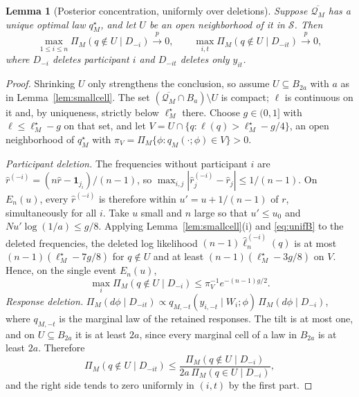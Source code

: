 \documentclass[11pt,letterpaper]{article}
\theoremstyle{plain}
\newtheorem{lemma}[theorem]{Lemma}
\theoremstyle{definition}
\begin{document}
\begin{lemma}[Posterior concentration, uniformly over deletions]\label{lem:deletion}
Suppose $\overline{\mathcal Q_M}$ has a unique optimal law $q^\star_M$, and let $U$ be an open neighborhood of it in $\mathcal S$. Then
\[
\max_{1\le i\le n}\Pi_M(q\notin U\mid D_{-i})\xrightarrow{p}0,\qquad
\max_{i,t}\Pi_M(q\notin U\mid D_{-it})\xrightarrow{p}0,
\]
where $D_{-i}$ deletes participant $i$ and $D_{-it}$ deletes only $y_{it}$.
\end{lemma}
\begin{proof}
Shrinking $U$ only strengthens the conclusion, so assume $U\subseteq B_{2a}$ with $a$ as in Lemma~\ref{lem:smallcell}. The set $(\overline{\mathcal Q_M}\cap B_a)\setminus U$ is compact; $\ell$ is continuous on it and, by uniqueness, strictly below $\ell_M^\star$ there. Choose $g\in(0,1]$ with $\ell\le\ell_M^\star-g$ on that set, and let $V=U\cap\{q:\ell(q)>\ell_M^\star-g/4\}$, an open neighborhood of $q^\star_M$ with $\pi_V=\Pi_M\{\phi:q_M(\cdot;\phi)\in V\}>0$.

\emph{Participant deletion.} The frequencies without participant $i$ are $\hat r^{(-i)}=(n\hat r-\mathbf 1_{j_i})/(n-1)$, so $\max_{i,j}|\hat r^{(-i)}_j-\hat r_j|\le1/(n-1)$. On $E_n(u)$, every $\hat r^{(-i)}$ is therefore within $u'=u+1/(n-1)$ of $r$, simultaneously for all $i$. Take $u$ small and $n$ large so that $u'\le u_0$ and $Nu'\log(1/a)\le g/8$. Applying Lemma~\ref{lem:smallcell}(i) and \eqref{eq:unifB} to the deleted frequencies, the deleted log likelihood $(n-1)\hat\ell^{(-i)}_n(q)$ is at most $(n-1)(\ell_M^\star-7g/8)$ for $q\notin U$ and at least $(n-1)(\ell_M^\star-3g/8)$ on $V$. Hence, on the single event $E_n(u)$,
\[
\max_i\Pi_M(q\notin U\mid D_{-i})\le\pi_V^{-1}e^{-(n-1)g/2}.
\]
\emph{Response deletion.} $\Pi_M(d\phi\mid D_{-it})\propto q_{M,-t}(y_{i,-t}\mid W_i;\phi)\,\Pi_M(d\phi\mid D_{-i})$, where $q_{M,-t}$ is the marginal law of the retained responses. The tilt is at most one, and on $U\subseteq B_{2a}$ it is at least $2a$, since every marginal cell of a law in $B_{2a}$ is at least $2a$. Therefore
\[
\Pi_M(q\notin U\mid D_{-it})\le\frac{\Pi_M(q\notin U\mid D_{-i})}{2a\,\Pi_M(q\in U\mid D_{-i})},
\]
and the right side tends to zero uniformly in $(i,t)$ by the first part.
\end{proof}
\end{document}
